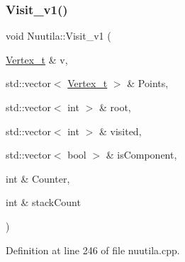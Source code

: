 \subsubsection{\texorpdfstring{Visit\+\_\+v1()}{Visit\_v1()}}
{\footnotesize\ttfamily void Nuutila\+::\+Visit\+\_\+v1 (\begin{DoxyParamCaption}\item[{\hyperlink{class_graph_component_ae67114a6ce5a001dc35e1996e1b45aa0}{Vertex\+\_\+t} \&}]{v,  }\item[{std\+::vector$<$ \hyperlink{class_graph_component_ae67114a6ce5a001dc35e1996e1b45aa0}{Vertex\+\_\+t} $>$ \&}]{Points,  }\item[{std\+::vector$<$ int $>$ \&}]{root,  }\item[{std\+::vector$<$ int $>$ \&}]{visited,  }\item[{std\+::vector$<$ bool $>$ \&}]{is\+Component,  }\item[{int \&}]{Counter,  }\item[{int \&}]{stack\+Count }\end{DoxyParamCaption})}



Definition at line 246 of file nuutila.\+cpp.


